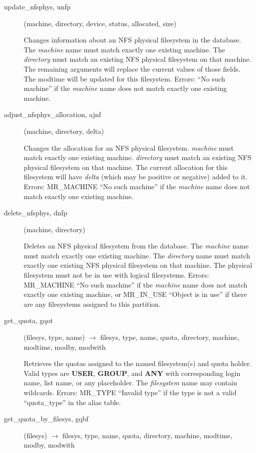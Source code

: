 \begin{description}
\item[update\_nfsphys, unfp](machine, directory, device, status,
allocated, size)

Changes information about an NFS physical filesystem in the database.
The {\em machine} name must match exactly one existing machine.  The
{\em directory} must match an existing NFS physical filesystem on that
machine.  The remaining arguments will replace the current values of
those fields.  The modtime will be updated for this filesystem.
Errors: ``No such machine'' if the {\em machine} name does not match
exactly one existing machine.

\item[adjust\_nfsphys\_allocation, ajnf](machine, directory, delta)

Changes the allocation for an NFS physical filesystem.  {\em machine}
must match exactly one existing machine.  {\em directory} must match an
existing NFS physical filesystem on that machine.  The current
allocation for this filesystem will have {\em delta} (which may be
positive or negative) added to it.  Errors: MR\_MACHINE ``No such
machine'' if the {\em machine} name does not match exactly one existing
machine.

\item[delete\_nfsphys, dnfp](machine, directory)

Deletes an NFS physical filesystem from the database.  The {\em machine}
name must match exactly one existing machine.  The {\em directory} name must
match exactly one existing NFS physical filesystem on that machine.
The physical filesystem must not be in use with logical filesystems.
Errors: MR\_MACHINE ``No such machine'' if the {\em machine} name does not
match exactly one existing machine, or MR\_IN\_USE ``Object is in use''
if there are any filesystems assigned to this partition.

\item[get\_quota, gqot](filesys, type, name) $\rightarrow$ filesys,
type, name, quota, directory, machine, modtime, modby, modwith

Retrieves the quotas assigned to the named filesystem(s) and quota
holder.  Valid types are {\bf USER}, {\bf GROUP}, and {\bf ANY} with
corresponding login name, list name, or any placeholder.  The
{\em filesystem} name may contain wildcards.  Errors: MR\_TYPE ``Invalid
type'' if the type is not a valid ``quota\_type'' in the alias table.

\item[get\_quota\_by\_filesys, gqbf](filesys) $\rightarrow$ filesys,
type, name, quota, directory, machine, modtime, modby, modwith


\end{description}

